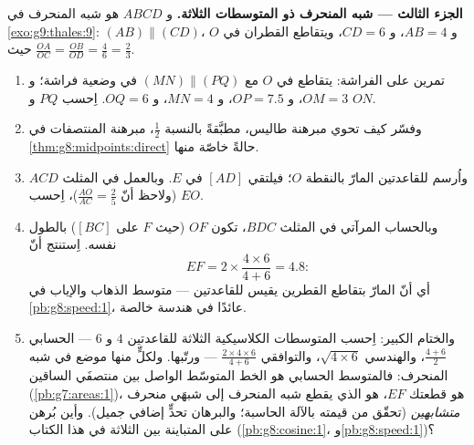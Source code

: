 \begin{problem}
\medskip
\noindent\textbf{الجزء الثالث --- شبه المنحرف ذو المتوسطات
الثلاثة.}
و $ABCD$ هو شبه المنحرف في \cref{exo:g9:thales:9}:
$(AB) \parallel (CD)$، و $AB = 4$، و $CD = 6$، ويتقاطع القطران في
$O$ حيث $\frac{OA}{OC} = \frac{OB}{OD} = \frac{4}{6} =
\frac23$.
\begin{enumerate}[resume]
  \item تمرين على الفراشة: يتقاطع  في $O$ مع
        $(MN) \parallel (PQ)$ في وضعية فراشة؛ و $OM = 3$،
        و $OP = 7.5$، و $MN = 4$، و $OQ = 6$. اِحسب $PQ$
        و $ON$.
  \item وفسّر كيف تحوي مبرهنة طاليس، مطبَّقةً بالنسبة
        $\frac12$، مبرهنة المنتصفات في
        \cref{thm:g8:midpoints:direct} حالةً خاصّة منها.
  \item واُرسم  للقاعدتين المارّ بالنقطة $O$؛ فيلتقي
        $[AD]$ في $E$. وبالعمل في المثلث $ACD$ (ولاحظ أنّ
        $\frac{AO}{AC} = \frac25$)، اِحسب $EO$.
  \item وبالحساب المرآتي في المثلث $BDC$، تكون  $OF$
        (حيث $F$ على $[BC]$) بالطول نفسه. اِستنتج أنّ
        \[
        EF = 2 \times \frac{4 \times 6}{4 + 6} = 4.8 :
        \]
        أي أنّ  المارّ بتقاطع القطرين يقيس
        \emph{} للقاعدتين --- متوسط الذهاب
        والإياب في \cref{pb:g8:speed:1}، عائدًا في هندسة خالصة.
  \item والختام الكبير: اِحسب المتوسطات الكلاسيكية الثلاثة
        للقاعدتين $4$ و $6$ --- الحسابي $\frac{4+6}{2}$،
        والهندسي $\sqrt{4 \times 6}$، والتوافقي
        $\frac{2 \times 4 \times 6}{4 + 6}$ --- ورتّبها. ولكلٍّ
        منها موضع في شبه المنحرف: فالمتوسط الحسابي هو الخط
        المتوسّط الواصل بين منتصفَي الساقين
        (\cref{pb:g7:areas:1})،  هو قطعتك
        $EF$،  هو  الذي يقطع شبه
        المنحرف إلى شبهَي منحرف \emph{متشابهين} (تحقّق من قيمته
        بالآلة الحاسبة؛ والبرهان تحدٍّ إضافي جميل). وأين بُرهن
        على المتباينة بين الثلاثة في هذا الكتاب
        (\cref{pb:g8:cosine:1}، و\cref{pb:g8:speed:1})؟
\end{enumerate}
\end{problem}
